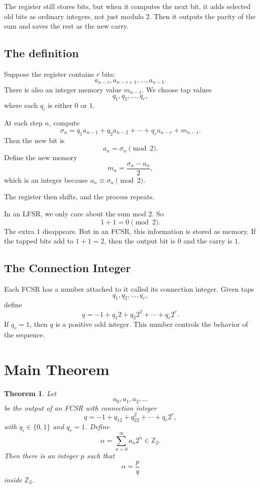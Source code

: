 \documentclass[12pt]{amsart}
\theoremstyle{plain}
\newtheorem{theorem}{Theorem}[section]
\theoremstyle{definition}
\theoremstyle{remark}
\newcommand{\Z}{\mathbb{Z}}
\begin{document}
The register still stores bits, but when it computes the next bit, it adds selected old bits as ordinary integers, not just modulo 2. Then it outputs the parity of the sum and saves the rest as the new carry.

\subsection{The definition}
Suppose the register contains $r$ bits:
$$a_{n - r}, a_{n - r + 1}, \ldots, a_{n - 1}.$$
There is also an integer memory value $m_{n - 1}$. We choose tap values
$$q_1, q_2, \ldots, q_r,$$
where each $q_i$ is either $0$ or $1$.

At each step $n$, compute
$$\sigma_n = q_1a_{n - 1} + q_2a_{n - 2} + \cdots + q_ra_{n - r} + m_{n - 1}.$$
Then the new bit is
$$a_n = \sigma_n \pmod{2}.$$
Define the new memory
$$m_n = \frac{\sigma_n - a_n}{2},$$
which is an integer because $a_n \equiv \sigma_n \pmod{2}$.

The register then shifts, and the process repeats.

In an LFSR, we only care about the sum mod $2$. So
$$1 + 1 = 0 \pmod{2}.$$
The extra $1$ disappears. But in an FCSR, this information is stored as memory. If the tapped bits add to $1 + 1 = 2$, then the output bit is $0$ and the carry is $1$.

\subsection{The Connection Integer}
Each FCSR has a number attached to it called its connection integer. Given taps
$$q_1, q_2, \ldots, q_r,$$
define
$$q = -1 + q_1 2 + q_2 2^2 + \cdots + q_r 2^r.$$
If $q_r = 1$, then $q$ is a positive odd integer. This number controls the behavior of the sequence.

\section{Main Theorem}
\begin{theorem}
Let
$$a_0, a_1, a_2, \ldots$$
be the output of an FCSR with connection integer
$$q = -1 + q_12 + q_22^2 + \cdots + q_r2^r,$$
with $q_i \in \{0, 1\}$ and $q_r = 1$. Define
$$\alpha = \sum_{n = 0}^\infty a_n2^n \in \Z_2.$$
Then there is an integer $p$ such that
$$\alpha = \frac{p}{q}$$
inside $\Z_2$.
\end{theorem}
\end{document}

